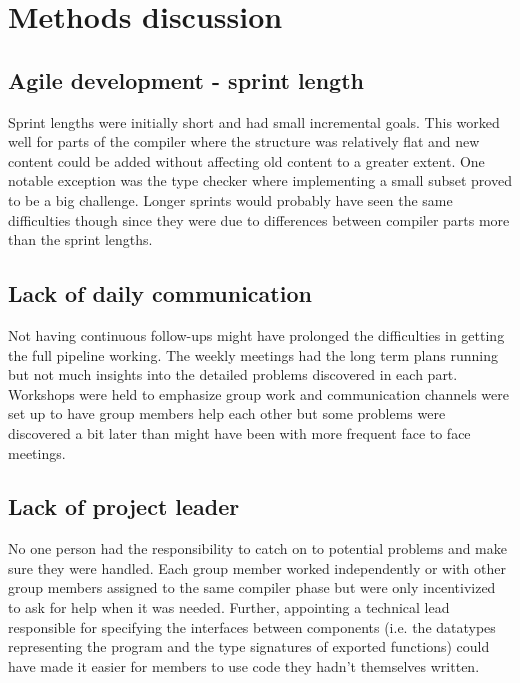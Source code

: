 

\section{Methods discussion}

\subsection{Agile development - sprint length}

Sprint lengths were initially short and had small incremental goals. This worked well for parts of the compiler where the structure was relatively flat and new content could be added without affecting old content to a greater extent. One notable exception was the type checker where implementing a small subset proved to be a big challenge. Longer sprints would probably have seen the same difficulties though since they were due to differences between compiler parts more than the sprint lengths.

\subsection{Lack of daily communication}

Not having continuous follow-ups might have prolonged the difficulties in getting the full pipeline working. The weekly meetings had the long term plans running but not much insights into the detailed problems discovered in each part. Workshops were held to emphasize group work and communication channels were set up to have group members help each other but some problems were discovered a bit later than might have been with more frequent face to face meetings.

\subsection{Lack of project leader}

No one person had the responsibility to catch on to potential problems and make sure they were handled. Each group member worked independently or with other group members assigned to the same compiler phase but were only incentivized to ask for help when it was needed. Further, appointing a technical lead responsible for specifying the interfaces between components (i.e. the datatypes representing the program and the type signatures of exported functions) could have made it easier for members to use code they hadn’t themselves written.


